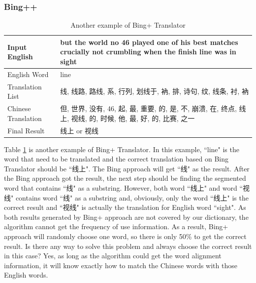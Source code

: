\subsubsection{Bing++}
\begin{table}[ht]
    \caption{Another example of Bing+ Translator}
    \label{table:bing_plus_plus_1}
    \begin{center}
    \begin{tabular}{| p{2.5cm} | p{4cm} |}
        \hline
        Input English & but the world no 46 played one of his best matches crucially not crumbling when the finish line was in sight\\
        \hline
        English Word & line \\
        \hline
        Translation List & \parbox[t]{4cm}{线, 线路, 路线, 系, 行列, 划线于, 衲, 排, 诗句, 纹, 线条, 衬, 衲}\\
        \hline
        Chinese Translation & 但, 世界, 没有, 46, 起, 最, 重要, 的, 是, 不, 崩溃, 在, 终点, 线上, 视线, 的, 时候, 他, 最, 好, 的, 比赛, 之一\\
        \hline
        Final Result & 线上 or 视线\\
        \hline
    \end{tabular}
    \end{center}
\end{table}
Table \ref{table:bing_plus_plus_1} is another example of Bing+ Translator. In this example, ``line" is the word that need to be translated and the correct translation based on Bing Translator should be ``线上". The Bing approach will get ``线" as the result. After the Bing approach got the result, the next step should be finding the segmented word that contains ``线" as a substring. However, both word ``线上" and word ``视线" contains word ``线" as a substring and, obviously, only the word ``线上" is the correct result and ``视线" is actually the translation for English word ``sight". As both results generated by Bing+ approach are not covered by our dictionary, the algorithm cannot get the frequency of use information. As a result, Bing+ approach will randomly choose one word, so there is only 50\% to get the correct result. Is there any way to solve this problem and always choose the correct result in this case? Yes, as long as the algorithm could get the word alignment information, it will know exactly how to match the Chinese words with those English words.
\\
